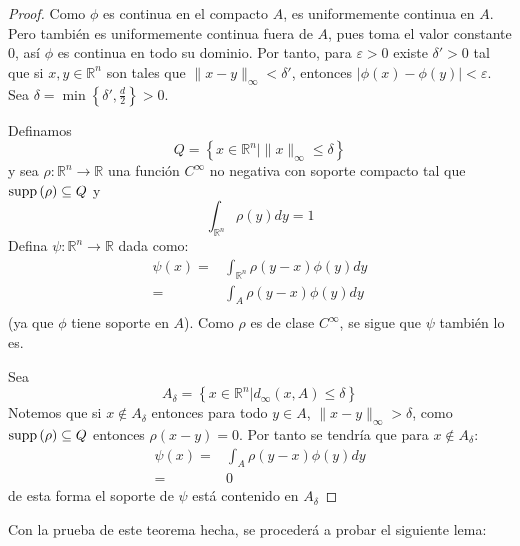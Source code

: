\documentclass[12pt]{report}
\theoremstyle{largebreak}
\newcommand\abs[1]{\ensuremath{\lvert#1\rvert}}
\newcommand\cf[3]{\ensuremath{#1:#2\rightarrow#3}}
\newcommand\supp[1]{\ensuremath{\textup{supp}\left(#1\right)}}
\begin{document}
\begin{proof}
    Como $\phi$ es continua en el compacto $A$, es uniformemente continua en $A$. Pero también es uniformemente continua fuera de $A$, pues toma el valor constante $0$, así $\phi$ es continua en todo su dominio.
    Por tanto, para $\varepsilon>0$ existe $\delta'>0$ tal que si $x,y\in\mathbb{R}^n$ son tales que $\|x-y\|_{\infty}<\delta'$, entonces $\abs{\phi(x)-\phi(y)}<\varepsilon$. Sea $\delta =\min\left\{\delta',\frac{d}{2}\right\}>0$.
    
    Definamos
    \begin{equation*}
        Q=\left\{x\in\mathbb{R}^n|\|x\|_{\infty}\leq\delta\right\}
    \end{equation*}
    y sea $\cf{\rho}{\mathbb{R}^n}{\mathbb{R}}$ una función $C^{\infty}$ no negativa con soporte compacto tal que $\supp{\rho}\subseteq Q$ y
    \begin{equation*}
        \int_{\mathbb{R}^n}\rho(y)dy=1
    \end{equation*}
    Defina $\cf{\psi}{\mathbb{R}^n}{\mathbb{R}}$ dada como:
    \begin{equation*}
        \begin{split}
            \psi(x)=&\int_{\mathbb{R}^n}\rho(y-x)\phi(y)dy\\
            =&\int_{A}\rho(y-x)\phi(y)dy\\
        \end{split}
    \end{equation*}
    (ya que $\phi$ tiene soporte en $A$). Como $\rho$ es de clase $C^{\infty}$, se sigue que $\psi$ también lo es.

    Sea
    \begin{equation*}
        A_{\delta}=\left\{x\in\mathbb{R}^n|d_{\infty}(x,A)\leq\delta\right\}
    \end{equation*}
    Notemos que si $x\notin A_\delta$ entonces para todo $y\in A$, $\|x-y\|_{\infty}>\delta$, como $\supp{\rho}\subseteq Q$ entonces $\rho(x-y)=0$. Por tanto se tendría que
    para $x\notin A_\delta$:
    \begin{equation*}
        \begin{split}
            \psi(x)=&\int_{A}\rho(y-x)\phi(y)dy\\
            =&0
        \end{split}
    \end{equation*}
    de esta forma el soporte de $\psi$ está contenido en $A_\delta$
    \end{proof}

Con la prueba de este teorema hecha, se procederá a probar el siguiente lema:
\end{document}
